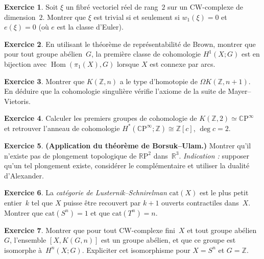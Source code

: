 \documentclass[12pt,a4paper,openany]{book}
\theoremstyle{definition}
\newtheorem{exercice}{Exercice}[chapter]
\theoremstyle{plain}
\theoremstyle{remark}
\newcommand{\Z}{\mathbb{Z}}
\newcommand{\R}{\mathbb{R}}
\newcommand{\RP}{\mathbb{R}\mathrm{P}}
\newcommand{\CP}{\mathbb{C}\mathrm{P}}
\DeclareMathOperator{\Hom}{Hom}
\begin{document}
\begin{exercice}\label{exo:obstruction-3}
  Soit $\xi$ un fibré vectoriel réel de rang~$2$ sur un CW-complexe de dimension~$2$.
  Montrer que $\xi$ est trivial si et seulement si $w_1(\xi) = 0$ et $e(\xi) = 0$
  (où $e$ est la classe d'Euler).
\end{exercice}

\begin{exercice}\label{exo:obstruction-4}
  En utilisant le théorème de représentabilité de Brown, montrer que pour tout
  groupe abélien~$G$, la première classe de cohomologie $H^1(X; G)$ est en bijection
  avec $\Hom(\pi_1(X), G)$ lorsque $X$ est connexe par arcs.
\end{exercice}

\begin{exercice}\label{exo:obstruction-5}
  Montrer que $K(\Z, n)$ a le type d'homotopie de $\Omega K(\Z, n+1)$.
  En déduire que la cohomologie singulière vérifie l'axiome de la suite de
  Mayer--Vietoris.
\end{exercice}

\begin{exercice}\label{exo:obstruction-6}
  Calculer les premiers groupes de cohomologie de $K(\Z, 2) \simeq \CP^\infty$ et
  retrouver l'anneau de cohomologie $H^*(\CP^\infty; \Z) \cong \Z[c]$, $\deg c = 2$.
\end{exercice}

\begin{exercice}\label{exo:obstruction-7}
  \textbf{(Application du théorème de Borsuk--Ulam.)}
  Montrer qu'il n'existe pas de plongement topologique de $\RP^2$ dans~$\R^3$.
  \emph{Indication :} supposer qu'un tel plongement existe, considérer le complémentaire
  et utiliser la dualité d'Alexander.
\end{exercice}

\begin{exercice}\label{exo:obstruction-8}
  La \emph{catégorie de Lusternik--Schnirelman} $\mathrm{cat}(X)$ est le plus petit
  entier~$k$ tel que $X$ puisse être recouvert par $k+1$ ouverts contractiles
  dans~$X$. Montrer que $\mathrm{cat}(S^n) = 1$ et que
  $\mathrm{cat}(T^n) = n$.
\end{exercice}

\begin{exercice}\label{exo:obstruction-9}
  Montrer que pour tout CW-complexe fini~$X$ et tout groupe abélien~$G$, l'ensemble
  $[X, K(G, n)]$ est un groupe abélien, et que ce groupe est isomorphe à~$H^n(X; G)$.
  Expliciter cet isomorphisme pour $X = S^n$ et $G = \Z$.
\end{exercice}
\end{document}
